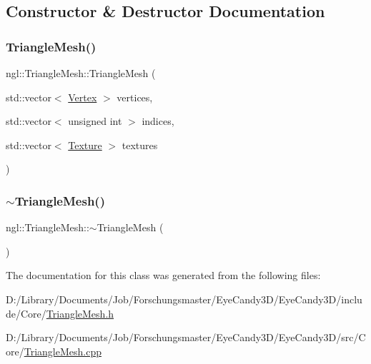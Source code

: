 \subsection{Constructor \& Destructor Documentation}
\mbox{\label{classngl_1_1_triangle_mesh_ab0c344f81dc7b9c8a4f26cc1ecb0f0bf}} 
\subsubsection{\texorpdfstring{Triangle\+Mesh()}{TriangleMesh()}}
{\footnotesize\ttfamily ngl\+::\+Triangle\+Mesh\+::\+Triangle\+Mesh (\begin{DoxyParamCaption}\item[{std\+::vector$<$ \mbox{\hyperlink{structngl_1_1_vertex}{Vertex}} $>$}]{vertices,  }\item[{std\+::vector$<$ unsigned int $>$}]{indices,  }\item[{std\+::vector$<$ \mbox{\hyperlink{classngl_1_1_texture}{Texture}} $>$}]{textures }\end{DoxyParamCaption})\hspace{0.3cm}{\ttfamily [explicit]}}

\mbox{\label{classngl_1_1_triangle_mesh_ad5be3d6abe081e05362f358c9bc556d8}} 
\subsubsection{\texorpdfstring{$\sim$\+Triangle\+Mesh()}{~TriangleMesh()}}
{\footnotesize\ttfamily ngl\+::\+Triangle\+Mesh\+::$\sim$\+Triangle\+Mesh (\begin{DoxyParamCaption}{ }\end{DoxyParamCaption})}



The documentation for this class was generated from the following files\+:\begin{DoxyCompactItemize}
\item 
D\+:/\+Library/\+Documents/\+Job/\+Forschungsmaster/\+Eye\+Candy3\+D/\+Eye\+Candy3\+D/include/\+Core/\mbox{\hyperlink{_triangle_mesh_8h}{Triangle\+Mesh.\+h}}\item 
D\+:/\+Library/\+Documents/\+Job/\+Forschungsmaster/\+Eye\+Candy3\+D/\+Eye\+Candy3\+D/src/\+Core/\mbox{\hyperlink{_triangle_mesh_8cpp}{Triangle\+Mesh.\+cpp}}\end{DoxyCompactItemize}
